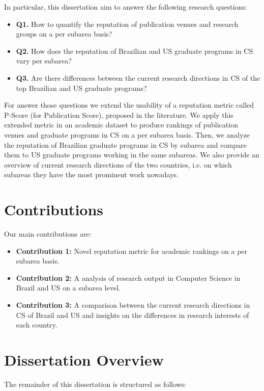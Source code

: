 \documentclass[msc]{ppgccufmg}
\begin{document}
In particular, this dissertation aim to answer the following research questions:
	
\begin{itemize}
	\item \textbf{Q1.} How to quantify the reputation of publication venues and research groups on a per subarea basis? 	
	\item \textbf{Q2.} How does the reputation of Brazilian and US graduate programs in CS vary per subarea? 	
	\item \textbf{Q3.} Are there differences between the current research directions in CS of the top Brazilian and US graduate programs?
\end{itemize}

For answer those questions we extend the usability of a reputation metric called P-Score (for Publication Score), proposed in the literature. We apply this extended metric in an academic dataset to produce rankings of publication venues and graduate programs in CS on a per subarea basis. Then, we analyze the reputation of Brazilian graduate programs in CS by subarea and compare them to US graduate programs working in the same subareas. We also provide an overview of current research directions of the two countries, i.e. on which subareas they have the most prominent work nowadays.

\section{Contributions}
Our main contributions are:

\begin{itemize}
	\item \textbf{Contribution 1:} Novel reputation metric for academic rankings on a per subarea basis.
	\item \textbf{Contribution 2:} A analysis of research output in Computer Science in Brazil and US on a subarea level.
	\item \textbf{Contribution 3:} A comparison between the current research directions in CS of Brazil and US and insights on the differences in research interests of each country.
\end{itemize}

\section{Dissertation Overview}
The remainder of this dissertation is structured as follows:
\end{document}
